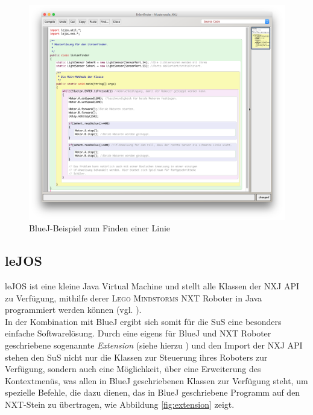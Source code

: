 \documentclass[paper=a4, DIV=14, BCOR=15mm, twoside=on, onecolumn=on, open = right, titlepage =on, parskip =half, headsepline = on, footsepline = on, chapterprefix = on, appendixprefix = off, fontsize = 12pt, numbers = noenddot, abstract = on]{scrbook}
\begin{document}
\begin{figure}[htpb]
\centering
\includegraphics[scale=0.35]{images/linienfinder_bluej.png} 
\caption{BlueJ-Beispiel zum Finden einer Linie}
\label{fig:Bsp BlueJ Linienfinder}
\end{figure}



\par \singlespacing
\subsection{leJOS}
\label{sec:lejos}
\onehalfspacing
leJOS ist eine kleine Java Virtual Machine und stellt alle Klassen der NXJ API zu Verfügung, mithilfe derer \textsc{Lego Mindstorms} NXT Roboter in Java programmiert werden können (vgl. \cite{lejos}).\\
In der Kombination mit BlueJ ergibt sich somit für die SuS eine besonders einfache Softwarelösung. Durch eine eigens für BlueJ und NXT Roboter geschriebene sogenannte \textit{Extension} (siehe hierzu \cite{bowes:12}) und den Import der NXJ API stehen den SuS nicht nur die Klassen zur Steuerung ihres Roboters zur Verfügung, sondern auch eine Möglichkeit, über eine Erweiterung des Kontextmenüs, was allen in BlueJ geschriebenen Klassen zur Verfügung steht, um spezielle Befehle, die dazu dienen, das in BlueJ geschriebene Programm auf den NXT-Stein zu übertragen, wie Abbildung \ref{fig:extension} zeigt.
\end{document}
